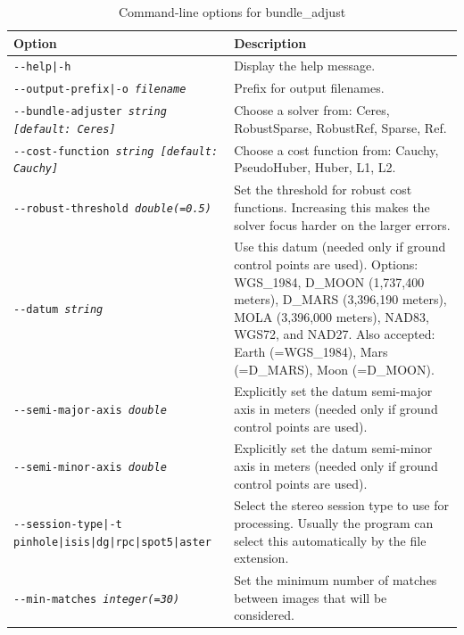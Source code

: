 \begin{longtable}{|l|p{7.5cm}|}
\caption{Command-line options for bundle\_adjust}
\label{tbl:bundleadjust}
\endfirsthead
\endhead
\endfoot
\endlastfoot
\hline
Option & Description \\ \hline \hline
\texttt{-\/-help|-h} & Display the help message. \\ \hline

\texttt{-\/-output-prefix|-o \textit{filename}} & Prefix for output filenames. \\ \hline

\texttt{-\/-bundle-adjuster \textit{string [default: Ceres]}} & Choose a solver from:
Ceres, RobustSparse, RobustRef, Sparse, Ref. \\ \hline

\texttt{-\/-cost-function \textit{string [default: Cauchy]}} & Choose a cost function
from: Cauchy, PseudoHuber, Huber, L1, L2. \\ \hline

\texttt{-\/-robust-threshold \textit{double(=0.5)}} & Set the threshold for robust
cost functions.  Increasing this makes the solver focus harder on the larger errors.\\ \hline

\texttt{-\/-datum \textit{string}} & Use this datum (needed only if ground control
points are used).  Options: WGS\_1984, D\_MOON (1,737,400 meters), D\_MARS (3,396,190 meters), MOLA (3,396,000 meters), NAD83, WGS72, and NAD27. Also accepted: Earth (=WGS\_1984), Mars (=D\_MARS), Moon (=D\_MOON). \\ \hline

\texttt{-\/-semi-major-axis \textit{double}} & Explicitly set the datum semi-major axis
in meters (needed only if ground control points are used).\\ \hline
\texttt{-\/-semi-minor-axis \textit{double}} & Explicitly set the datum semi-minor axis
in meters (needed only if ground control points are used).\\ \hline

\texttt{-\/-session-type|-t pinhole|isis|dg|rpc|spot5|aster} & Select the stereo
session type to use for processing. Usually the program can select this
automatically by the file extension.\\ \hline

\texttt{-\/-min-matches \textit{integer(=30)}} & Set the minimum number of matches
between images that will be considered. \\ \hline


\end{longtable}
